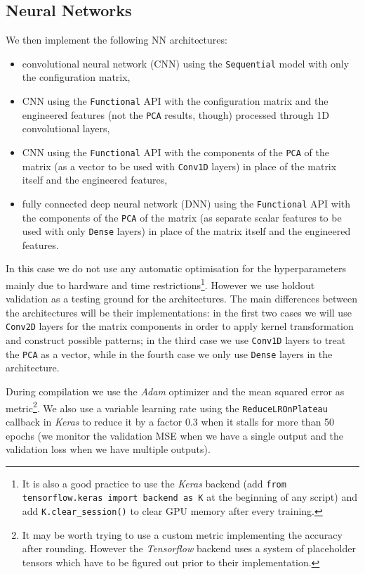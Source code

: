 \subsection{Neural Networks}
    We then implement the following NN architectures:
    \begin{itemize}
        \item convolutional neural network (CNN) using the \texttt{Sequential} model with only the configuration matrix,
        \item CNN using the \texttt{Functional} API with the configuration matrix and the engineered features (not the \texttt{PCA} results, though) processed through 1D convolutional layers,
        \item CNN using the \texttt{Functional} API with the components of the \texttt{PCA} of the matrix (as a vector to be used with \texttt{Conv1D} layers) in place of the matrix itself and the engineered features,
        \item fully connected deep neural network (DNN) using the \texttt{Functional} API with the components of the \texttt{PCA} of the matrix (as separate scalar features to be used with only \texttt{Dense} layers) in place of the matrix itself and the engineered features.
    \end{itemize}
    In this case we do not use any automatic optimisation for the hyperparameters mainly due to hardware and time restrictions\footnote{It is also a good practice to use the \textit{Keras} backend (add \texttt{from tensorflow.keras import backend as K} at the beginning of any script) and add \texttt{K.clear\_session()} to clear GPU memory after every training.}. However we use holdout validation as a testing ground for the architectures. The main differences between the architectures will be their implementations: in the first two cases we will use \texttt{Conv2D} layers for the matrix components in order to apply kernel transformation and construct possible patterns; in the third case we use \texttt{Conv1D} layers to treat the \texttt{PCA} as a vector, while in the fourth case we only use \texttt{Dense} layers in the architecture.
    
    During compilation we use the \textit{Adam} optimizer and the mean squared error as metric\footnote{It may be worth trying to use a custom metric implementing the accuracy after rounding. However the \textit{Tensorflow} backend uses a system of placeholder tensors which have to be figured out prior to their implementation.}. We also use a variable learning rate using the \texttt{ReduceLROnPlateau} callback in \textit{Keras} to reduce it by a factor 0.3 when it stalls for more than 50 epochs (we monitor the validation MSE when we have a single output and the validation loss when we have multiple outputs).
    
